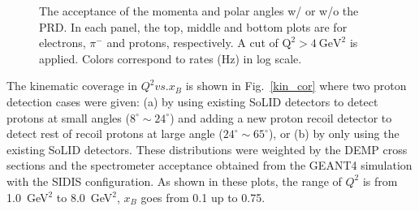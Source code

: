\begin{figure}[!ht]
 \begin{center}
   \caption[The acceptance of the momenta and scattering angles for electrons,
     $\pi^{-}$ and protons]{\footnotesize{The acceptance of the momenta and
       polar angles w/ or w/o the PRD. In each panel, the top, middle and
       bottom plots are for electrons, $\pi^{-}$ and protons, respectively. A
       cut of $\mathrm{Q^{2}>4~GeV^{2}}$ is applied. Colors correspond to rates
       (Hz) in log scale.}}
  \label{p_theta}
  \end{center}
\end{figure}
The kinematic coverage in $Q^{2} vs. x_{B}$ is shown in Fig.~\ref{kin_cor}
where two proton detection cases were given: (a) by using existing SoLID
detectors to detect protons at small angles ($8^{\circ}\sim24^{\circ}$) and
adding a new proton recoil detector to detect rest of recoil protons at large
angle ($24^{\circ}\sim65^{\circ}$), or (b) by only using the existing SoLID
detectors. These distributions were weighted by the DEMP cross sections and the
spectrometer acceptance obtained from the GEANT4 simulation with the SIDIS
configuration. As shown in these plots, the range of $Q^{2}$ is from
1.0~GeV$^{2}$ to 8.0~GeV$^{2}$, $x_{B}$ goes from 0.1 up to 0.75.

